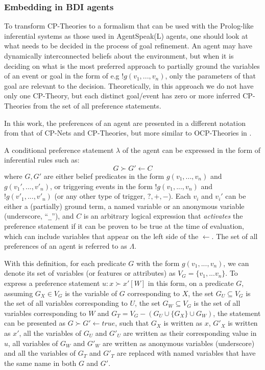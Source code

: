 \subsubsection{Embedding in BDI agents}
\label{sssec:transform}
To transform CP-Theories to a formalism that can be used with the Prolog-like inferential systems as those used in AgentSpeak(L) agents, one should look at what needs to be decided in the process of goal refinement. An agent may have dynamically interconnected beliefs about the environment, but when it is deciding on what is the most preferred approach to partially ground the variables of an event or goal in the form of e.g $!g(v_1,...,v_n)$, only the parameters of that goal are relevant to %
the decision. Theoretically, in this approach we do not have only one CP-Theory, but each distinct goal/event has zero or more inferred CP-Theories from the set of all preference statements. 

In this work, the preferences of an agent are presented in a different notation from that of CP-Nets and CP-Theories, but more similar to OCP-Theories in \cite{DiNoia2015}.

A conditional preference statement $\lambda$ of the agent can be expressed in the form of inferential rules such as:
\begin{equation*}
    G \succ G' \leftarrow C
\end{equation*}
where $G,G'$ are either belief predicates in the form $g(v_1,...,v_n)$ and $g({v}_1',...,{v}'_n)$, or triggering events in the form $!g(v_1,...,v_n)$ and $!g({v}'_1,...,{v}'_n)$ (or any other type of trigger, $?,+,-$). Each $v_i$ and ${v}_i'$ can be either a (partially) ground term, a named variable or an anonymous variable (underscore, ``\texttt{\_}''), and $C$ is an arbitrary logical expression that \textit{activates} the preference statement if it can be proven to be true at the time of evaluation, which can include variables that appear on the left side of the $\leftarrow$. The set of all preferences of an agent is referred to as $\Lambda$.

With this definition, for each predicate $G$ with the form $g(v_1,...,v_n)$, we can denote its set of variables (or features or attributes) as $V_G = \{v_1,...v_n\}$. %
To express a preference statement $u : x \succ x' [W]$ in this form, on a predicate $G$, assuming $G_X \in V_G$ is the variable of $G$ corresponding to $X$, the set $G_U \subseteq V_G$ is the set of all variables corresponding to $U$, the set $G_W \subseteq V_G$ is the set of all variables corresponding to $W$ and $G_T = V_G - (G_U \cup \{G_X\} \cup G_W)$, the statement can be presented as $G \succ G' \leftarrow true$, such that $G_X$ is written as $x$, $G'_X$ is written as $x'$, all the variables of $G_U$ and $G'_U$ are written as their corresponding value in $u$, all variables of $G_W$ and $G'_W$ are written as anonymous variables (underscore) and all the variables of $G_T$ and $G'_T$ are replaced with named variables that have the same name in both $G$ and $G'$.

